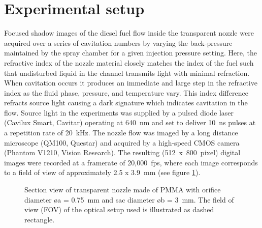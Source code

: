 \documentclass[letterpaper,twocolumn,10pt]{ilass}
\begin{document}
\section*{Experimental setup}
Focused shadow images of the diesel fuel flow inside the transparent nozzle
were acquired over a series of cavitation numbers by varying
the back-pressure maintained by the spray chamber for a given injection pressure
setting.
%
Here, the refractive index of the nozzle material closely matches the index of the fuel such that undisturbed liquid in the channel transmits light with minimal refraction.
When cavitation occurs it produces an immediate and large step in the refractive index
as the fluid phase, pressure, and temperature vary. This index difference refracts source
light causing a dark signature which indicates cavitation in the flow.  
%
Source light in the experiments was supplied by a pulsed diode laser (Cavilux Smart, Cavitar)
operating at 640~nm and set to deliver 10~ns pulses at a repetition rate of 20~kHz.
%
The nozzle flow was imaged by a long distance microscope (QM100, Questar)
and acquired by a high-speed CMOS camera (Phantom V1210, Vision Research).
%
The resulting (512~x~800~pixel) digital images were recorded at a framerate of 20,000~fps,
where each image corresponds to a field of view of approximately 2.5 x 3.9~mm (see figure \ref{fig3}). 
%

\begin{figure}[h]
\begin{center}
\end{center}
\vspace*{-10mm}
\caption{Section view of transparent nozzle made of PMMA with orifice diameter
         \o a = 0.75~mm and sac diameter \o b = 3~mm. The field of view (FOV)
				 of the optical setup used is illustrated as dashed rectangle.}
\label{fig3} 
\end{figure}
\end{document}

